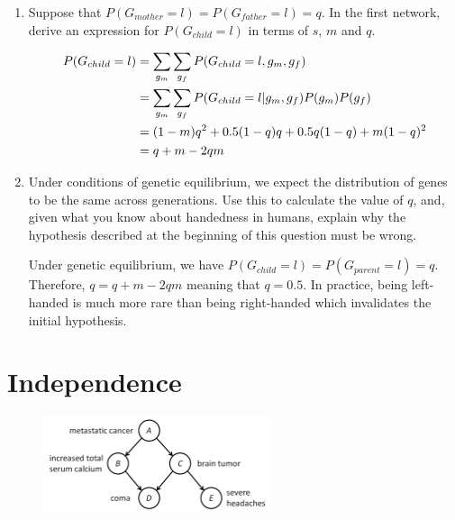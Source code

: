 \documentclass[11pt, a4paper]{article}
\begin{document}
\begin{enumerate}
    \item Suppose that $P(G_{mother} = l) = P(G_{father} = l) = q$. In the first network, derive an expression for $P(G_{child} = l)$ in terms of $s$, $m$ and $q$.
    \begin{solution}
        \begin{align*}
            P(G_{child} = l) & = \sum_{g_m} \sum_{g_f} P(G_{child} = l, g_m, g_f) \\
            & = \sum_{g_m} \sum_{g_f} P(G_{child} = l \vert g_m, g_f) P(g_m) P(g_f) \\
            & = (1 - m) q^2 + 0.5 (1 - q) q + 0.5 q (1 - q) + m (1 - q)^2 \\
            & = q + m - 2qm
        \end{align*}
    \end{solution}

    \item Under conditions of genetic equilibrium, we expect the distribution of genes to be the same across generations. Use this to calculate the value of $q$, and, given what you know about handedness in humans, explain why the hypothesis described at the beginning of this question must be wrong.

    \begin{solution}
        Under genetic equilibrium, we have $P(G_{child} = l) = P(G_{parent} = l) = q$. Therefore, $q = q + m - 2 q m$ meaning that $q = 0.5$. In practice, being left-handed is much more rare than being right-handed which invalidates the initial hypothesis.
    \end{solution}
\end{enumerate}

\newpage

\section{Independence}

\begin{figure}[h]
    \centering
    \includegraphics[width=0.6\textwidth]{figures/e3_independence.png}
\end{figure}
\end{document}
